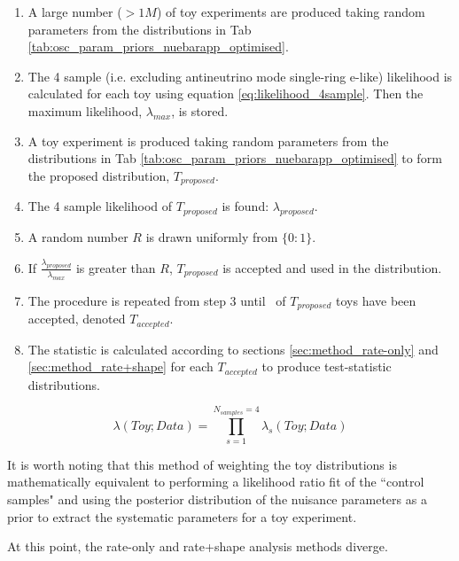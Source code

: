 \begin{enumerate}
	\item A large number ($>1M$) of toy experiments are produced taking random parameters from the distributions in Tab \ref{tab:osc_param_priors_nuebarapp_optimised}.
	\item The 4 sample (i.e. excluding antineutrino mode single-ring e-like) likelihood is calculated for each toy using equation \ref{eq:likelihood_4sample}. Then the maximum likelihood, $\lambda_{max}$, is stored.
	\item A toy experiment is produced taking random parameters from the distributions in Tab \ref{tab:osc_param_priors_nuebarapp_optimised} to form the proposed distribution, $T_{proposed}$.
	\item The 4 sample likelihood of $T_{proposed}$ is found: $\lambda_{proposed}$.
	\item A random number $R$ is drawn uniformly from $\{0:1\}$.
	\item If $\frac{\lambda_{proposed}}{\lambda_{max}}$ is greater than $R$, $T_{proposed}$ is accepted and used in the distribution.
	\item The procedure is repeated from step 3 until \NToysFakeDataRatePlusShape\ of $T_{proposed}$ toys have been accepted, denoted $T_{accepted}$.
	\item The statistic is calculated according to sections \ref{sec:method_rate-only} and \ref{sec:method_rate+shape} for each $T_{accepted}$ to produce test-statistic distributions.
\end{enumerate}

\begin{equation} \label{eq:likelihood_4sample}
\lambda \left( Toy; Data \right) =
\prod_{s=1}^{N_{samples} = 4} \lambda_s \left( Toy; Data \right)
\end{equation}

It is worth noting that this method of weighting the toy distributions is mathematically equivalent to performing a likelihood ratio fit of the ``control samples" and using the posterior distribution of the nuisance parameters as a prior to extract the systematic parameters for a toy experiment.

At this point, the rate-only and rate+shape analysis methods diverge.




